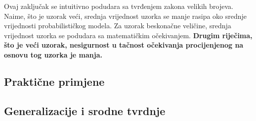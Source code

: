Ovaj zaključak se intuitivno podudara sa tvrđenjem zakona velikih brojeva.
Naime, što je uzorak veći, srednja vrijednost uzorka se manje rasipa oko srednje
vrijednosti probabilističkog modela. Za uzorak beskonačne veličine, srednja
vrijednost uzorka se podudara sa matematičkim očekivanjem. \textbf{Drugim
riječima, što je veći uzorak, nesigurnost u tačnost očekivanja
procijenjenog na osnovu tog uzorka je manja.} %

\subsection{Praktične primjene}

\subsection{Generalizacije i srodne tvrdnje}

